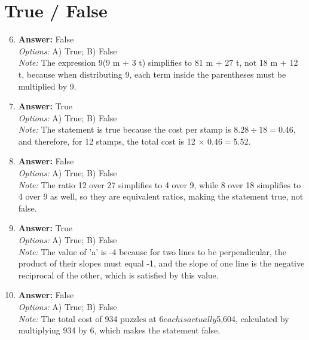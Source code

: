 \documentclass[12pt]{article}
\begin{document}
\section*{True / False}
\begin{enumerate}[label=\arabic*.]
\setcounter{enumi}{5}
\item \textbf{Answer:} False
\\ \textit{Options:} A) True; B) False
\\ \textit{Note:} The expression 9(9 m + 3 t) simplifies to 81 m + 27 t, not 18 m + 12 t, because when distributing 9, each term inside the parentheses must be multiplied by 9.
\item \textbf{Answer:} True
\\ \textit{Options:} A) True; B) False
\\ \textit{Note:} The statement is true because the cost per stamp is $8.28 ÷ 18 = $0.46, and therefore, for 12 stamps, the total cost is 12 × $0.46 = $5.52.
\item \textbf{Answer:} False
\\ \textit{Options:} A) True; B) False
\\ \textit{Note:} The ratio 12 over 27 simplifies to 4 over 9, while 8 over 18 simplifies to 4 over 9 as well, so they are equivalent ratios, making the statement true, not false.
\item \textbf{Answer:} True
\\ \textit{Options:} A) True; B) False
\\ \textit{Note:} The value of 'a' is -4 because for two lines to be perpendicular, the product of their slopes must equal -1, and the slope of one line is the negative reciprocal of the other, which is satisfied by this value.
\item \textbf{Answer:} False
\\ \textit{Options:} A) True; B) False
\\ \textit{Note:} The total cost of 934 puzzles at $6 each is actually $5,604, calculated by multiplying 934 by 6, which makes the statement false.
\end{enumerate}
\end{document}
